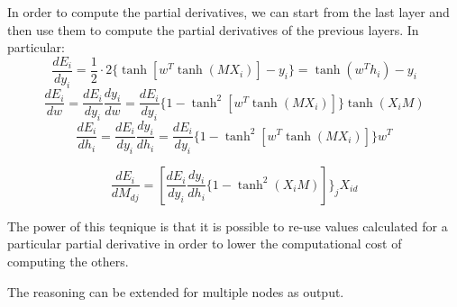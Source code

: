 In order to compute the partial derivatives, we can start from the last layer and then use them to compute
the partial derivatives of the previous layers.
In particular:
$$ \frac{dE_i}{dy_i} = \frac{1}{2} \cdot 2 \{ \tanh[w^T \tanh(M X_i)] - y_i\} = \tanh(w^T h_i) - y_i $$
$$ \frac{dE_i}{dw} = \frac{dE_i}{dy_i} \frac{dy_i}{dw} = \frac{dE_i}{dy_i} \{1 - \tanh^2[w^T \tanh(M X_i)]\} \tanh(X_i M) $$
$$ \frac{dE_i}{dh_i} = \frac{dE_i}{dy_i} \frac{dy_i}{dh_i} = \frac{dE_i}{dy_i} \{1 - \tanh^2[w^T \tanh(M X_i)]\} w^T $$

$$ \frac{dE_i}{dM_{dj}} = [\frac{dE_i}{dy_i} \frac{dy_i}{dh_i} \{1 - \tanh^2(X_i M)]\}_j X_{id}$$

The power of this teqnique is that it is possible to re-use values calculated for a particular partial derivative in order to lower the computational cost of computing the others.

The reasoning can be extended for multiple nodes as output.